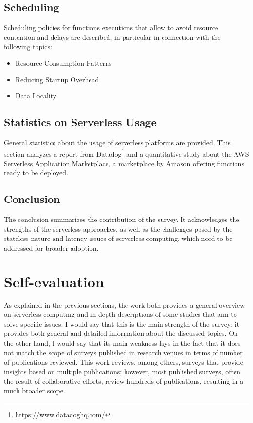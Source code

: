 \documentclass{scrartcl}
\begin{document}
\subsection{Scheduling}
Scheduling policies for functions executions that allow to avoid resource contention and delays are described, in particular in connection with the following topics:
\begin{itemize}
  \item Resource Consumption Patterns
  \item Reducing Startup Overhead
  \item Data Locality
\end{itemize}

\subsection{Statistics on Serverless Usage}
General statistics about the usage of serverless platforms are provided. This section analyzes a report from Datadog\footnote{\url{https://www.datadoghq.com/}} and a quantitative study about the AWS Serverless Application Marketplace, a marketplace by Amazon offering functions ready to be deployed.

\subsection{Conclusion}
The conclusion summarizes the contribution of the survey. It acknowledges the strengths of the serverless approaches, as well as the challenges posed by the stateless nature and latency issues of serverless computing, which need to be addressed for broader adoption.

\newpage
\section{Self-evaluation}
As explained in the previous sections, the work both provides a general overview on serverless computing and in-depth descriptions of some studies that aim to solve specific issues. I would say that this is the main strength of the survey: it provides both general and detailed information about the discussed topics. On the other hand, I would say that its main weakness lays in the fact that it does not match the scope of surveys published in research venues in terms of number of publications reviewed. This work reviews, among others, surveys that provide insights based on multiple publications; however, most published surveys, often the result of collaborative efforts, review hundreds of publications, resulting in a much broader scope.
\end{document}

